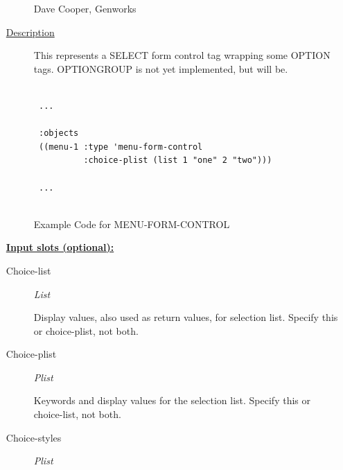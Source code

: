 \documentclass [11pt]{book}
\begin{document}
\begin{itemize}
\begin{description}
Dave Cooper, Genworks



\item [
\underline{Description}]


This represents a SELECT form control tag wrapping some OPTION tags.
OPTIONGROUP is not yet implemented, but will be.



\end{description}




\begin{figure}
\begin{lrbox}{\boxedverb}
\begin{minipage}{\linewidth}
{\small

\begin{verbatim}

 ...
 
 :objects
 ((menu-1 :type 'menu-form-control
          :choice-plist (list 1 "one" 2 "two")))

 ...


\end{verbatim}}
\end{minipage}
\end{lrbox}
\fbox{\usebox{\boxedverb}}

\caption{Example Code for MENU-FORM-CONTROL}

\label{fig:example-code-MENU-FORM-CONTROL}

\end{figure}





\textbf{
\underline{Input slots (optional):}}

\begin{description}

\item [Choice-list]
\emph{List}

 Display values, also used as return values, for selection list. Specify this or choice-plist, not both.




\item [Choice-plist]
\emph{Plist}

 Keywords and display values for the selection list. Specify this or choice-list, not both.




\item [Choice-styles]
\emph{Plist}


\end{description}
\end{itemize}
\end{document}
